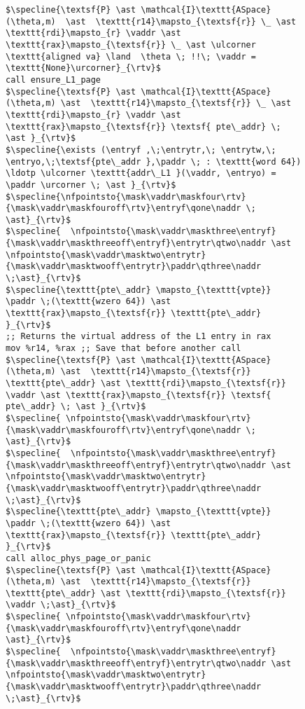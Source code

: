 \begin{figure}\footnotesize
  \begin{lstlisting}
$\specline{\textsf{P} \ast \mathcal{I}\texttt{ASpace}(\theta,m)  \ast  \texttt{r14}\mapsto_{\textsf{r}} \_ \ast \texttt{rdi}\mapsto_{r} \vaddr \ast \texttt{rax}\mapsto_{\textsf{r}} \_ \ast \ulcorner \texttt{aligned va} \land  \theta \; !!\; \vaddr = \texttt{None}\urcorner}_{\rtv}$
call ensure_L1_page
$\specline{\textsf{P} \ast \mathcal{I}\texttt{ASpace}(\theta,m) \ast  \texttt{r14}\mapsto_{\textsf{r}} \_ \ast \texttt{rdi}\mapsto_{r} \vaddr \ast \texttt{rax}\mapsto_{\textsf{r}} \textsf{ pte\_addr} \; \ast }_{\rtv}$
$\specline{\exists (\entryf ,\;\entrytr,\; \entrytw,\; \entryo,\;\textsf{pte\_addr },\paddr \; : \texttt{word 64}) \ldotp \ulcorner \texttt{addr\_L1 }(\vaddr, \entryo) = \paddr \urcorner \; \ast }_{\rtv}$
$\specline{\nfpointsto{\mask\vaddr\maskfour\rtv}{\mask\vaddr\maskfouroff\rtv}\entryf\qone\naddr \; \ast}_{\rtv}$ 
$\specline{  \nfpointsto{\mask\vaddr\maskthree\entryf}{\mask\vaddr\maskthreeoff\entryf}\entrytr\qtwo\naddr \ast \nfpointsto{\mask\vaddr\masktwo\entrytr}{\mask\vaddr\masktwooff\entrytr}\paddr\qthree\naddr \;\ast}_{\rtv}$
$\specline{\texttt{pte\_addr} \mapsto_{\texttt{vpte}} \paddr \;(\texttt{wzero 64}) \ast \texttt{rax}\mapsto_{\textsf{r}} \texttt{pte\_addr}  }_{\rtv}$
;; Returns the virtual address of the L1 entry in rax
mov %r14, %rax ;; Save that before another call
$\specline{\textsf{P} \ast \mathcal{I}\texttt{ASpace}(\theta,m) \ast  \texttt{r14}\mapsto_{\textsf{r}} \texttt{pte\_addr} \ast \texttt{rdi}\mapsto_{\textsf{r}} \vaddr \ast \texttt{rax}\mapsto_{\textsf{r}} \textsf{ pte\_addr} \; \ast }_{\rtv}$
$\specline{ \nfpointsto{\mask\vaddr\maskfour\rtv}{\mask\vaddr\maskfouroff\rtv}\entryf\qone\naddr \; \ast}_{\rtv}$ 
$\specline{  \nfpointsto{\mask\vaddr\maskthree\entryf}{\mask\vaddr\maskthreeoff\entryf}\entrytr\qtwo\naddr \ast \nfpointsto{\mask\vaddr\masktwo\entrytr}{\mask\vaddr\masktwooff\entrytr}\paddr\qthree\naddr \;\ast}_{\rtv}$
$\specline{\texttt{pte\_addr} \mapsto_{\texttt{vpte}} \paddr \;(\texttt{wzero 64}) \ast \texttt{rax}\mapsto_{\textsf{r}} \texttt{pte\_addr}  }_{\rtv}$
call alloc_phys_page_or_panic
$\specline{\textsf{P} \ast \mathcal{I}\texttt{ASpace}(\theta,m) \ast  \texttt{r14}\mapsto_{\textsf{r}} \texttt{pte\_addr} \ast \texttt{rdi}\mapsto_{\textsf{r}} \vaddr \;\ast}_{\rtv}$
$\specline{ \nfpointsto{\mask\vaddr\maskfour\rtv}{\mask\vaddr\maskfouroff\rtv}\entryf\qone\naddr \ast}_{\rtv}$ 
$\specline{  \nfpointsto{\mask\vaddr\maskthree\entryf}{\mask\vaddr\maskthreeoff\entryf}\entrytr\qtwo\naddr \ast \nfpointsto{\mask\vaddr\masktwo\entrytr}{\mask\vaddr\masktwooff\entrytr}\paddr\qthree\naddr \;\ast}_{\rtv}$

\end{lstlisting}
\end{figure}
